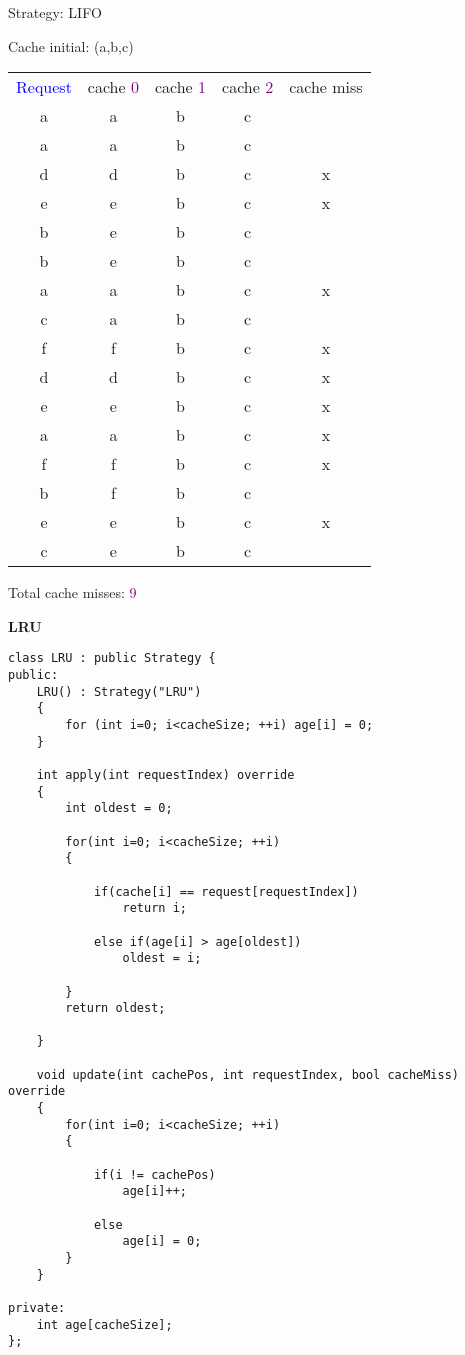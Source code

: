 \begin{tcolorbox}
{
Strategy: LIFO

\vspace{\baselineskip}

Cache initial: (a,b,c)

\vspace{\baselineskip}
\begin{tabular}{*{5}{c}}
\textcolor{Blue}{Request} & cache \textcolor{Purple}{0} & cache \textcolor{Purple}{1} & cache \textcolor{Purple}{2} & cache miss \\
a & a & b & c & \ \\
a & a & b & c & \ \\
d & d & b & c & x \\
e & e & b & c & x \\
b & e & b & c & \ \\
b & e & b & c & \ \\
a & a & b & c & x \\
c & a & b & c & \ \\
f & f & b & c & x \\
d & d & b & c & x \\
e & e & b & c & x \\
a & a & b & c & x \\
f & f & b & c & x \\
b & f & b & c & \ \\
e & e & b & c & x \\
c & e & b & c & \ \\
\end{tabular}

\vspace{\baselineskip}

Total cache misses: \textcolor{Purple}{9}}
\end{tcolorbox}

\vspace{\baselineskip}

\textbf{LRU}

\begin{tcolorbox}
\begin{verbatim}
class LRU : public Strategy {
public:
	LRU() : Strategy("LRU")
	{
		for (int i=0; i<cacheSize; ++i) age[i] = 0;
	}
	
	int apply(int requestIndex) override
	{
		int oldest = 0;
		
		for(int i=0; i<cacheSize; ++i)
		{
		
			if(cache[i] == request[requestIndex])
				return i;
			
			else if(age[i] > age[oldest])
				oldest = i;
		
		}
		return oldest;
		
	}
	
	void update(int cachePos, int requestIndex, bool cacheMiss) override
	{
		for(int i=0; i<cacheSize; ++i)
		{
		
			if(i != cachePos)
				age[i]++;
			
			else
				age[i] = 0;
		}
	}

private:
	int age[cacheSize];
};

\end{verbatim}
\end{tcolorbox}

